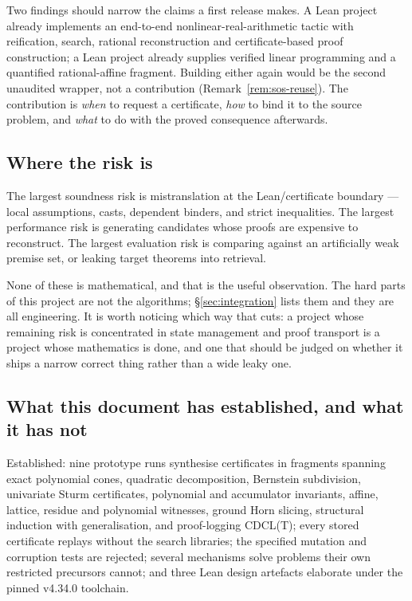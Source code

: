 Two findings should narrow the claims a first release makes. A Lean 
project already implements an end-to-end nonlinear-real-arithmetic tactic with
reification, search, rational reconstruction and certificate-based proof
construction; a Lean  project already supplies verified linear
programming and a quantified rational-affine fragment. Building either again
would be the second unaudited wrapper, not a contribution
(Remark~\ref{rem:sos-reuse}). The contribution is \emph{when} to request a
certificate, \emph{how} to bind it to the source problem, and \emph{what} to do
with the proved consequence afterwards.

\subsection{Where the risk is}

The largest soundness risk is mistranslation at the Lean/certificate boundary
--- local assumptions, casts, dependent binders, and strict inequalities. The
largest performance risk is generating candidates whose proofs are expensive to
reconstruct. The largest evaluation risk is comparing against an artificially
weak premise set, or leaking target theorems into retrieval.

None of these is mathematical, and that is the useful observation. The hard
parts of this project are not the algorithms; \S\ref{sec:integration} lists them
and they are all engineering. It is worth noticing which way that cuts: a
project whose remaining risk is concentrated in state management and proof
transport is a project whose mathematics is done, and one that should be judged
on whether it ships a narrow correct thing rather than a wide leaky one.

\subsection{What this document has established, and what it has not}

Established: nine prototype runs synthesise certificates in fragments spanning
exact polynomial cones, quadratic decomposition, Bernstein subdivision,
univariate Sturm certificates, polynomial and accumulator invariants, affine,
lattice, residue and polynomial witnesses, ground Horn slicing, structural
induction with generalisation, and proof-logging CDCL(T); every stored
certificate replays without the search libraries; the specified mutation and
corruption tests are rejected; several mechanisms solve problems their own
restricted precursors cannot; and three Lean design artefacts elaborate under
the pinned v4.34.0 toolchain.


